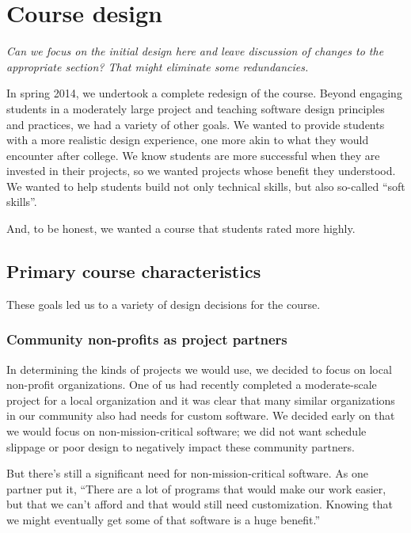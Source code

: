 \section{Course design}

\textit{Can we focus on the initial design here and leave discussion of changes to the appropriate section? That might eliminate some redundancies.}

In spring 2014, we undertook a complete redesign of the course.  
Beyond engaging students in a moderately large project and teaching 
software design principles and practices, 
we had a variety of other goals. 
We wanted
to provide students with a more realistic design experience, one more
akin to what they would encounter after college.  We know students
are more successful when they are invested in their projects, so we
wanted projects whose benefit they understood.  We wanted to help
students build not only technical skills, but also so-called ``soft
skills''.  

And, to be honest, we wanted a course that students rated more highly.

\subsection{Primary course characteristics}

These goals led us to a variety of design decisions for the course.

\subsubsection{Community non-profits as project partners}

In determining the kinds of projects we would use, we decided to
focus on local non-profit organizations.  One of us had recently
completed a moderate-scale project for a local organization and it
was clear that many similar organizations in our community also had
needs for custom software.  We decided early on that we would focus
on non-mission-critical software; we did not want schedule slippage
or poor design to negatively impact these community partners.

But there's still a significant need for non-mission-critical software.
As one partner put it, ``There are a lot of programs that would make
our work easier, but that we can't afford and that would still need
customization.  Knowing that we might eventually get some of that
software is a huge benefit.''  

